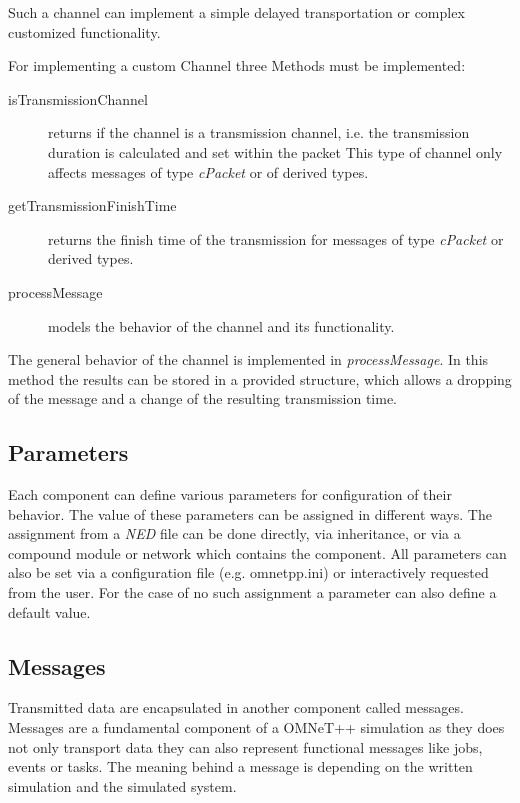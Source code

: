 Such a channel can implement a simple delayed transportation or complex customized functionality. \cite[section 3.5]{omnet_manual}

For implementing a custom Channel three Methods must be implemented:

\begin{description}
    \item[isTransmissionChannel] returns if the channel is a transmission channel, i.e. the transmission duration is calculated and set within the packet
    This type of channel only affects messages of type \emph{cPacket} or of derived types.
    \item[getTransmissionFinishTime] returns the finish time of the transmission for messages of type \emph{cPacket} or derived types.
    \item[processMessage] models the behavior of the channel and its functionality.
\end{description}

The general behavior of the channel is implemented in \emph{processMessage}.
In this method the results can be stored in a provided structure, which allows a dropping of the message and a change of the resulting transmission time. \cite[section 4.8]{omnet_manual}

\subsection{Parameters}
\label{sec:omnet_components_parameters}
Each component can define various parameters for configuration of their behavior.
The value of these parameters can be assigned in different ways.
The assignment from a \emph{NED} file can be done directly, via inheritance, or via a compound module or network which contains the component.
All parameters can also be set via a configuration file (e.g. omnetpp.ini) or interactively requested from the user.
For the case of no such assignment a parameter can also define a default value. \cite[section 3.6]{omnet_manual}


\subsection{Messages}
\label{sec:omnet_components_messages}
Transmitted data are encapsulated in another component called messages.
Messages are a fundamental component of a OMNeT++ simulation as they does not only transport data they can also represent functional messages like jobs, events or tasks.
The meaning behind a message is depending on the written simulation and the simulated system.

